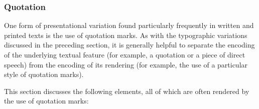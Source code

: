 \subsubsection[{Quotation}]{Quotation}\label{COHQQ}\par
One form of presentational variation found particularly frequently in written and printed texts is the use of quotation marks. As with the typographic variations discussed in the preceding section, it is generally helpful to separate the encoding of the underlying textual feature (for example, a quotation or a piece of direct speech) from the encoding of its rendering (for example, the use of a particular style of quotation marks).\par
This section discusses the following elements, all of which are often rendered by the use of quotation marks: 
\begin{sansreflist}
  

\end{sansreflist}
